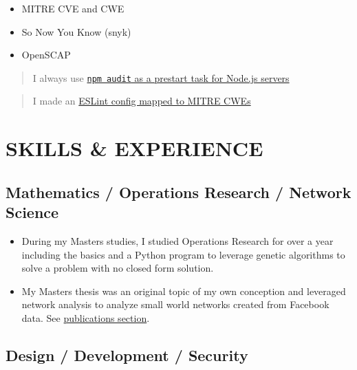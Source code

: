 \documentclass[10pt]{article}
\def\tightlist{}
\begin{document}
\begin{itemize}
\tightlist
\item
  MITRE CVE and CWE
\item
  So Now You Know (snyk)
\item
  OpenSCAP
\end{itemize}

\begin{quote}
I always use
\href{https://github.com/jhwohlgemuth/tomo-cli/blob/master/src/commands/create-server/index.js\#L82}{\texttt{npm\ audit}
as a prestart task for Node.js servers}
\end{quote}

\begin{quote}
I made an
\href{https://github.com/omahajs/eslint-config-omaha-prime-grade/blob/master/RULES_FOR_SECURITY.md}{ESLint
config mapped to MITRE CWEs}
\end{quote}

\hypertarget{skills-experience}{%
\section{SKILLS \& EXPERIENCE}\label{skills-experience}}

\hypertarget{mathematics-operations-research-network-science}{%
\subsection{Mathematics / Operations Research / Network
Science}\label{mathematics-operations-research-network-science}}

\begin{itemize}
\tightlist
\item
  During my Masters studies, I studied Operations Research for over a
  year including the basics and a Python program to leverage genetic
  algorithms to solve a problem with no closed form solution.
\item
  My Masters thesis was an original topic of my own conception and
  leveraged network analysis to analyze small world networks created
  from Facebook data. See
  \protect\hyperlink{publications-citations}{publications section}.
\end{itemize}

\hypertarget{design-development-security}{%
\subsection{Design / Development /
Security}\label{design-development-security}}
\end{document}
